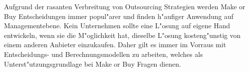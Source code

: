 Aufgrund der rasanten Verbreitung von Outsourcing Strategien werden Make or Buy Entscheidungen immer popul"arer und finden h"aufiger Anwendung auf Managementebene. Kein Unternehmen sollte eine L"osung auf eigene Hand entwickeln, wenn sie die M"oglichkeit hat, dieselbe L"osung kosteng"unstig von einem anderen Anbieter einzukaufen. Daher gilt es immer im Vorraus mit Entscheidungs- und Berechnungsmodellen zu arbeiten, welches als Unterst"utzungsgrundlage bei Make or Buy Fragen dienen.